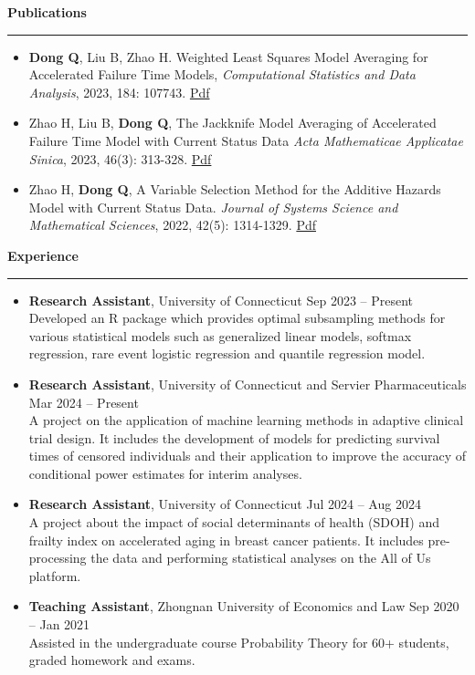 \documentclass[a4paper,10pt]{article}
\newcommand{\resheading}[1]{
  \vspace{8pt}
  \noindent\textbf{\large #1}
  \vspace{4pt}
  \hrule
  \vspace{8pt}
}
\begin{document}
\resheading{Publications}
\begin{itemize}[left=0pt, label={}]
\item \textbf{Dong Q}, Liu B, Zhao H. Weighted Least Squares Model Averaging for Accelerated Failure Time Models,  \emph{Computational Statistics and Data Analysis}, 2023, 184: 107743. \href{https://dqksnow.github.io/pdfs/dong2023weighted.pdf}{Pdf}
  
\item Zhao H, Liu B, \textbf{Dong Q}, The Jackknife Model Averaging of Accelerated Failure Time Model with Current Status Data \emph{Acta Mathematicae Applicatae Sinica}, 2023, 46(3): 313-328. \href{https://dqksnow.github.io/pdfs/zhao2023jackknife.pdf}{Pdf}
  
\item Zhao H, \textbf{Dong Q}, A Variable Selection Method for the Additive Hazards Model with Current Status Data. \emph{Journal of Systems Science and Mathematical Sciences}, 2022, 42(5): 1314-1329. \href{https://dqksnow.github.io/pdfs/hui2022variable.pdf}{Pdf}
  
\end{itemize}

\resheading{Experience}
\begin{itemize}[left=0pt, label={}]

    \item \textbf{Research Assistant}, University of Connecticut \hfill Sep 2023 -- Present \\
    Developed an R package which provides optimal subsampling methods for
various statistical models such as generalized linear models, softmax
regression, rare event logistic regression and quantile regression model.

    \item \textbf{Research Assistant}, University of Connecticut and Servier Pharmaceuticals \hfill Mar 2024 -- Present \\
    A project on the application of machine learning methods in adaptive
clinical trial design. It includes the development of models for predicting
survival times of censored individuals and their application to improve the
accuracy of conditional power estimates for interim analyses.
      
    \item \textbf{Research Assistant}, University of Connecticut \hfill Jul 2024 -- Aug 2024 \\
    A project about the impact of social determinants of health (SDOH) and
frailty index on accelerated aging in breast cancer patients. It includes
pre-processing the data and performing statistical analyses on the All of Us
platform.
    
    \item \textbf{Teaching Assistant}, Zhongnan University of Economics and Law \hfill Sep 2020 -- Jan 2021 \\
    Assisted in the undergraduate course Probability Theory for 60+ students,
graded homework and exams.
  \end{itemize}
  
\end{document}
